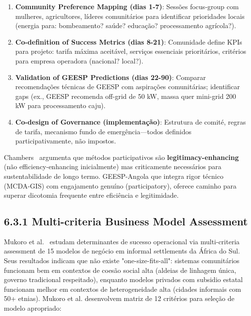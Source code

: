 \documentclass[12pt, a4paper]{article}
\begin{document}
\begin{enumerate}
\item \textbf{Community Preference Mapping (dias 1-7)}: Sessões focus-group com mulheres, agricultores, líderes comunitários para identificar prioridades locais (energia para: bombeamento? saúde? educação? processamento agrícola?).
\item \textbf{Co-definition of Success Metrics (dias 8-21)}: Comunidade define KPIs para projeto: tarifa máxima aceitável, serviços essenciais prioritários, critérios para empresa operadora (nacional? local?).
\item \textbf{Validation of GEESP Predictions (dias 22-90)}: Comparar recomendações técnicas de GEESP com aspirações comunitárias; identificar gaps (ex., GEESP recomenda off-grid de 50 kW, massa quer mini-grid 200 kW para processamento caju).
\item \textbf{Co-design of Governance (implementação)}: Estrutura de comité, regras de tarifa, mecanismo fundo de emergência—todos definidos participativamente, não impostos.
\end{enumerate}

Chambers~\citep{Chambers2019} argumenta que métodos participativos são \textbf{legitimacy-enhancing} (não efficiency-enhancing inicialmente) mas criticamente necessários para sustentabilidade de longo termo. GEESP-Angola que integra rigor técnico (MCDA-GIS) com engajamento genuíno (participatory), oferece caminho para superar dicotomia frequente entre eficiência e legitimidade.

\subsection*{6.3.1 Multi-criteria Business Model Assessment}

Mukoro et al.~\citep{Mukoro2022} estudam determinantes de sucesso operacional via multi-criteria assessment de 15 modelos de negócio em informal settlements da África do Sul. Seus resultados indicam que não existe "one-size-fits-all": sistemas comunitários funcionam bem em contextos de coesão social alta (aldeias de linhagem única, governo tradicional respeitado), enquanto modelos privados com subsidio estatal funcionam melhor em contextos de heterogeneidade alta (cidades informais com 50+ etnias). Mukoro et al. desenvolvem matriz de 12 critérios para seleção de modelo apropriado:
\end{document}

